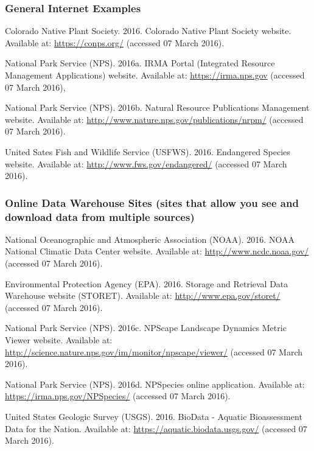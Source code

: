 \documentclass[
]{article}
\begin{document}
\hypertarget{general-internet-examples}{%
\subsubsection{General Internet
Examples}\label{general-internet-examples}}

Colorado Native Plant Society. 2016. Colorado Native Plant Society
website. Available at: \url{https://conps.org/} (accessed 07 March
2016).

National Park Service (NPS). 2016a. IRMA Portal (Integrated Resource
Management Applications) website. Available at:
\url{https://irma.nps.gov} (accessed 07 March 2016),

National Park Service (NPS). 2016b. Natural Resource Publications
Management website. Available at:
\url{http://www.nature.nps.gov/publications/nrpm/} (accessed 07 March
2016).

United Sates Fish and Wildlife Service (USFWS). 2016. Endangered Species
website. Available at: \url{http://www.fws.gov/endangered/} (accessed 07
March 2016).

\hypertarget{online-data-warehouse-sites-sites-that-allow-you-see-and-download-data-from-multiple-sources}{%
\subsubsection{Online Data Warehouse Sites (sites that allow you see and
download data from multiple
sources)}\label{online-data-warehouse-sites-sites-that-allow-you-see-and-download-data-from-multiple-sources}}

National Oceanographic and Atmospheric Association (NOAA). 2016. NOAA
National Climatic Data Center website. Available at:
\url{http://www.ncdc.noaa.gov/} (accessed 07 March 2016).

Environmental Protection Agency (EPA). 2016. Storage and Retrieval Data
Warehouse website (STORET). Available at:
\url{http://www.epa.gov/storet/} (accessed 07 March 2016).

National Park Service (NPS). 2016c. NPScape Landscape Dynamics Metric
Viewer website. Available at:
\url{http://science.nature.nps.gov/im/monitor/npscape/viewer/} (accessed
07 March 2016).

National Park Service (NPS). 2016d. NPSpecies online application.
Available at: \url{https://irma.nps.gov/NPSpecies/} (accessed 07 March
2016).

United States Geologic Survey (USGS). 2016. BioData - Aquatic
Bioassessment Data for the Nation. Available at:
\url{https://aquatic.biodata.usgs.gov/} (accessed 07 March 2016).
\end{document}
